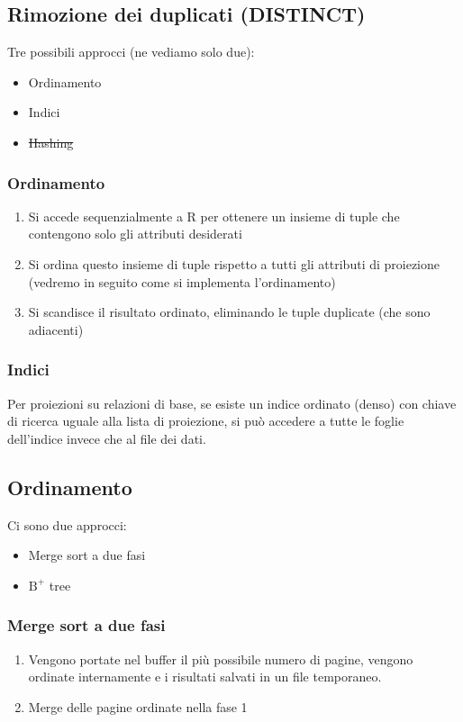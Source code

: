 \subsection{Rimozione dei duplicati (DISTINCT)}
Tre possibili approcci (ne vediamo solo due):
\begin{itemize}
    \item Ordinamento
    \item Indici
    \item \sout{Hashing}
\end{itemize}

\subsubsection{Ordinamento}
\begin{enumerate}
    \item Si accede sequenzialmente a R per ottenere un insieme di tuple che contengono solo gli attributi desiderati
    
    \item Si ordina questo insieme di tuple rispetto a tutti gli attributi di proiezione (vedremo in seguito come si implementa l’ordinamento)
    
    \item Si scandisce il risultato ordinato, eliminando le tuple duplicate (che sono adiacenti)
\end{enumerate}

\subsubsection{Indici}
Per proiezioni su relazioni di base, se esiste un indice ordinato (denso) con chiave di ricerca uguale alla lista di proiezione, si può accedere a tutte le foglie dell'indice invece che al file dei dati.

\subsection{Ordinamento}
Ci sono due approcci:
\begin{itemize}
    \item Merge sort a due fasi
    \item $\text{B}^+$ tree
\end{itemize}

\subsubsection{Merge sort a due fasi}
\begin{enumerate}
    \item Vengono portate nel buffer il più possibile numero di pagine, vengono ordinate internamente e i risultati salvati in un file temporaneo.
    \item Merge delle pagine ordinate nella fase 1
\end{enumerate}

